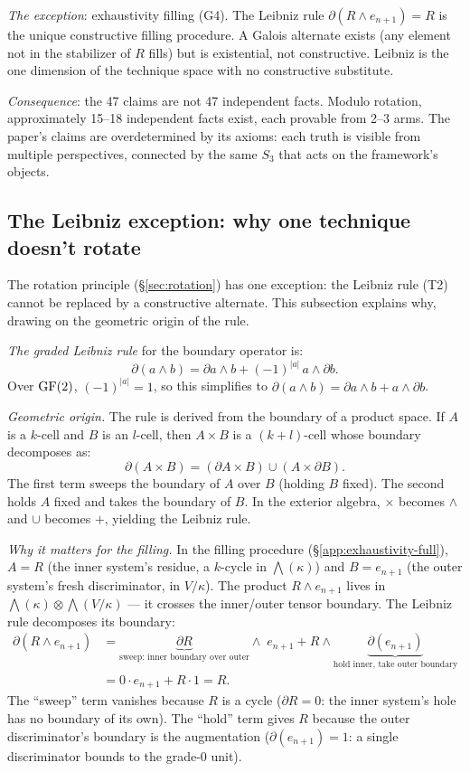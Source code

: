 \emph{The exception}: exhaustivity filling (G4). The
Leibniz rule $\partial(R \wedge e_{n+1}) = R$ is the
unique constructive filling procedure. A Galois
alternate exists (any element not in the stabilizer of
$R$ fills) but is existential, not constructive.
Leibniz is the one dimension of the technique space
with no constructive substitute.

\emph{Consequence}: the 47 claims are not 47 independent
facts. Modulo rotation, approximately 15--18 independent
facts exist, each provable from 2--3 arms. The paper's
claims are overdetermined by its axioms: each truth is
visible from multiple perspectives, connected by the
same $S_3$ that acts on the framework's objects.



\subsection{The Leibniz exception: why one technique
  doesn't rotate}
\label{sec:leibniz-exception}

The rotation principle (\S\ref{sec:rotation}) has one
exception: the Leibniz rule (T2) cannot be replaced by
a constructive alternate. This subsection explains why,
drawing on the geometric origin of the rule.

\emph{The graded Leibniz rule} for the boundary operator
is:
\[
  \partial(a \wedge b) = \partial a \wedge b
  + (-1)^{|a|}\, a \wedge \partial b.
\]
Over $\operatorname{GF}(2)$, $(-1)^{|a|} = 1$, so this simplifies to
$\partial(a \wedge b) = \partial a \wedge b + a \wedge
\partial b$.

\emph{Geometric origin.}
The rule is derived from the boundary of a product space.
If $A$ is a $k$-cell and $B$ is an $l$-cell, then
$A \times B$ is a $(k{+}l)$-cell whose boundary
decomposes as:
\[
  \partial(A \times B) = (\partial A \times B)
  \cup (A \times \partial B).
\]
The first term sweeps the boundary of $A$ over $B$
(holding $B$ fixed). The second holds $A$ fixed and
takes the boundary of $B$. In the exterior algebra,
$\times$ becomes $\wedge$ and $\cup$ becomes $+$,
yielding the Leibniz rule.

\emph{Why it matters for the filling.}
In the filling procedure (\S\ref{app:exhaustivity-full}),
$A = R$ (the inner system's residue, a $k$-cycle in
$\bigwedge(\kappa)$) and $B = e_{n+1}$ (the outer
system's fresh discriminator, in $V/\kappa$). The product
$R \wedge e_{n+1}$ lives in $\bigwedge(\kappa) \otimes
\bigwedge(V/\kappa)$ --- it crosses the inner/outer
tensor boundary. The Leibniz rule decomposes its
boundary:
\begin{align*}
  \partial(R \wedge e_{n+1})
  &= \underbrace{\partial R}_{\text{sweep: inner boundary
       over outer}} \wedge\; e_{n+1}
  + R \wedge \underbrace{\partial(e_{n+1})}_{\text{hold
       inner, take outer boundary}} \\
  &= 0 \cdot e_{n+1} + R \cdot 1 = R.
\end{align*}
The ``sweep'' term vanishes because $R$ is a cycle
($\partial R = 0$: the inner system's hole has no
boundary of its own). The ``hold'' term gives $R$
because the outer discriminator's boundary is the
augmentation ($\partial(e_{n+1}) = 1$: a single
discriminator bounds to the grade-0 unit).

